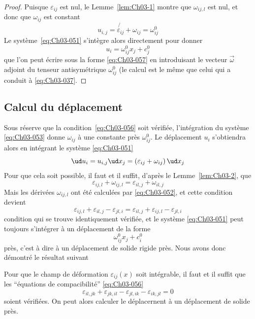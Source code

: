 \begin{proof}
    Puisque $\varepsilon_{ij}$ est nul, le Lemme~\ref{lem:Ch03-1} montre que $\omega_{ij,l}$ est nul, et donc que $\omega_{ij}$ est constant
    \begin{equation*}
        u_{i,j} = \not{\varepsilon_{ij}} + \omega_{ij} = \omega_{ij}^0
    \end{equation*}
    Le système~\eqref{eq:Ch03-051} s'intègre alors directement pour donner
    \begin{equation*}
        u_i = \omega_{ij}^0 x_j + c_{j}^0
    \end{equation*}
    que l'on peut écrire sous la forme \eqref{eq:Ch03-057} en introduisant le vecteur $\vec{\omega}$ adjoint du tenseur antisymétrique $\omega_{ij}^0$ (le calcul est le même que celui qui a conduit à \eqref{eq:Ch03-037}.
\end{proof}
\subsection{Calcul du déplacement} \label{ssec:Ch03-3.2}
Sous réserve que la condition~\eqref{eq:Ch03-056} soit vérifiée, l'intégration du système \eqref{eq:Ch03-053} donne $\omega_{ij}$ à une constante près $\omega_{ij}^0$.
Le déplacement $u_i$ s'obtiendra alors en intégrant le système \eqref{eq:Ch03-051}
\begin{equation*}
    \ud u_i = u_{i,j} \ud x_j = \left( \varepsilon_{ij} + \omega_{ij} \right) \ud x_j
\end{equation*}
Pour que cela soit possible, il faut et il suffit, d'après le Lemme~\ref{lem:Ch03-2}, que
\begin{equation*}
    \varepsilon_{ij,l} + \omega_{ij,l} = \varepsilon_{il,j} + \omega_{il,j}
\end{equation*}
Mais les dérivées $\omega_{ij,l}$ ont été calculées par \eqref{eq:Ch03-052}, et cette condition devient 
\begin{equation*}
    \varepsilon_{ij,l} + \varepsilon_{il,j} - \varepsilon_{jl,i} = \varepsilon_{il,j} + \varepsilon_{ij,l} - \varepsilon_{jl,i}
\end{equation*}
condition qui se trouve identiquement vérifiée, et le système \eqref{eq:Ch03-051} peut toujours s'intégrer à un déplacement de la forme 
\begin{equation*}
    \omega_{ij}^0 x_j + c_i^0
\end{equation*}
près, c'est à dire à un déplacement de solide rigide près.
Nous avons donc démontré le résultat suivant
\begin{thm} \label{thm:Ch03-3}
    Pour que le champ de déformation $\varepsilon_{ij}(x)$ soit intégrable, il faut et il suffit que les ``équations de compacibilité'' \eqref{eq:Ch03-056}
    \begin{equation*}
        \varepsilon_{il,jk} + \varepsilon_{jk,il} - \varepsilon_{jl,ik} - \varepsilon_{ik,jl} = 0
    \end{equation*}
    soient vérifiées.
    On peut alors calculer le déplacernent à un déplacement de solide près.
\end{thm}

